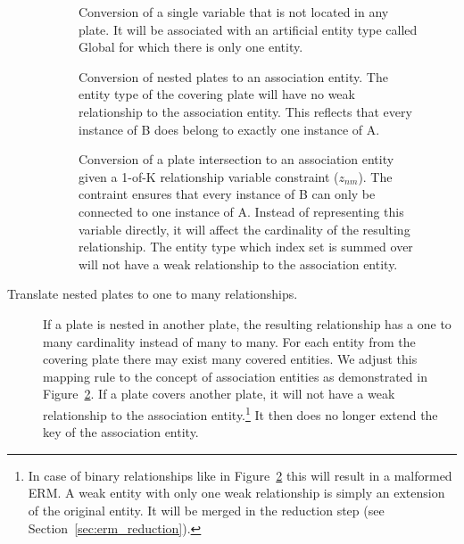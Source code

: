 \begin{description}
\begin{figure}[p]
\centering
\scalebox{\tikzScale}{\adjustTikzSize }
\caption{Conversion of a single variable that is not located in any plate. It will be associated with an artificial entity type called Global for which there is only one entity.}\label{fig:pm2erm_uno_global}
\end{figure}

\begin{figure}[p]
\centering
\scalebox{\tikzScale}{\adjustTikzSize }
\caption{Conversion of nested plates to an association entity. The entity type of the covering plate will have no weak relationship to the association entity. This reflects that every instance of B does belong to exactly one instance of A.}\label{fig:pm2erm_covered_1}
\end{figure}

\begin{figure}[p]
\centering
\scalebox{\tikzScale}{\adjustTikzSize }
\caption{Conversion of a plate intersection to an association entity given a 1-of-K relationship variable constraint ($z_{nm}$). The contraint ensures that every instance of B can only be connected to one instance of A. Instead of representing this variable directly, it will affect the cardinality of the resulting relationship. The entity type which index set is summed over will not have a weak relationship to the association entity.}\label{fig:pm2erm_bi_constraints}
\end{figure}

\item[Translate nested plates to one to many relationships.] If a plate is nested in another plate, the resulting relationship has a one to many cardinality instead of many to many. For each entity from the covering plate there may exist many covered entities. We adjust this mapping rule to the concept of association entities as demonstrated in Figure~\ref{fig:pm2erm_covered_1}. If a plate covers another plate, it will not have a weak relationship to the association entity.\footnote{In case of binary relationships like in Figure~\ref{fig:pm2erm_covered_1} this will result in a malformed ERM. A weak entity with only one weak relationship is simply an extension of the original entity. It will be merged in the reduction step (see Section~\ref{sec:erm_reduction}).} It then does no longer extend the key of the association entity.
\end{description}

